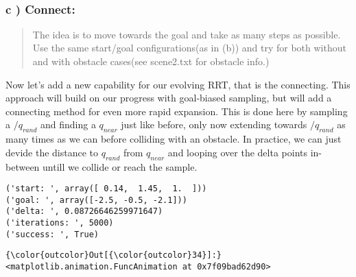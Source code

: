 \documentclass{article}
\begin{document}
    \begin{center}
    \end{center}
    { \hspace*{\fill} \\}
    

    \subsubsection{c ) Connect:}


    \begin{quote}
The idea is to move towards the goal and take as many steps as possible.
Use the same start/goal configurations(as in (b)) and try for both
without and with obstacle cases(see scene2.txt for obstacle info.)
\end{quote}

    Now let's add a new capability for our evolving RRT, that is the
connecting. This approach will build on our progress with goal-biased
sampling, but will add a connecting method for even more rapid
expansion. This is done here by sampling a $/q_{rand}$ and finding a
$q_{near}$ just like before, only now extending towards $/q_{rand}$ as
many times as we can before colliding with an obstacle. In practice, we
can just devide the distance to $q_{rand}$ from $q_{near}$ and looping
over the delta points in-between untill we collide or reach the sample.



    \begin{Verbatim}[commandchars=\\\{\}]
('start: ', array([ 0.14,  1.45,  1.  ]))
('goal: ', array([-2.5, -0.5, -2.1]))
('delta: ', 0.08726646259971647)
('iterations: ', 5000)
('success: ', True)
    \end{Verbatim}



            \begin{Verbatim}[commandchars=\\\{\}]
{\color{outcolor}Out[{\color{outcolor}34}]:} <matplotlib.animation.FuncAnimation at 0x7f09bad62d90>
\end{Verbatim}
        
    \begin{center}
    \end{center}
    { \hspace*{\fill} \\}
    
\end{document}

